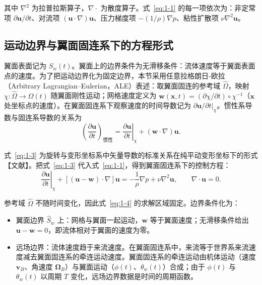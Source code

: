 \documentclass[11pt,a4paper]{ctexart}
\numberwithin{equation}{section}
\begin{document}
其中 $\nabla^2$ 为拉普拉斯算子，$\nabla\cdot$ 为散度算子。式~\eqref{eq:1-1} 的每一项依次为：非定常项 $\partial\bm{u}/\partial t$、对流项 $(\bm{u}\cdot\nabla)\bm{u}$、压力梯度项 $-(1/\rho)\nabla p$、粘性扩散项 $\nu\nabla^2\bm{u}$。

\subsection{运动边界与翼面固连系下的方程形式}

翼面表面记为 $S_w(t)$。翼面上的边界条件为无滑移条件：流体速度等于翼面表面点的速度。为了把运动边界化为固定边界，本节采用任意拉格朗日-欧拉（Arbitrary Lagrangian--Eulerian，ALE）表述：取翼面固连的参考域 $\hat{\Omega}$，映射 $\chi\colon \hat{\Omega} \to \Omega(t)$ 随翼面刚性运动；网格速度定义为 $\bm{w}(\bm{x}, t) = (\partial\chi/\partial t)\circ\chi^{-1}$（$\bm{x}$ 处坐标点的速度）。在翼面固连系下观察速度的时间导数记为 $\partial\bm{u}/\partial t|_\chi$。惯性系导数与固连系导数的关系为
\begin{equation}
  \left(\frac{\partial\bm{u}}{\partial t}\right)_{\text{惯性}}
  = \left.\frac{\partial\bm{u}}{\partial t}\right|_\chi + (\bm{w}\cdot\nabla)\bm{u}. \label{eq:1-3}
\end{equation}

式~\eqref{eq:1-3} 为旋转与变形坐标系中矢量导数的标准关系在纯平动变形坐标下的形式【文献】。把式~\eqref{eq:1-3} 代入式~\eqref{eq:1-1}，得到翼面固连系下的控制方程：
\begin{equation}
  \left.\frac{\partial\bm{u}}{\partial t}\right|_\chi + [(\bm{u} - \bm{w})\cdot\nabla]\bm{u}
  = -\frac{1}{\rho}\nabla p + \nu\nabla^2\bm{u}, \qquad \nabla\cdot\bm{u} = 0. \label{eq:1-4}
\end{equation}

参考域 $\hat{\Omega}$ 不随时间变化，因此式~\eqref{eq:1-4} 的求解区域固定。边界条件化为：

\begin{itemize}
  \item 翼面边界 $\hat{S}_w$ 上：网格与翼面一起运动，$\bm{w}$ 等于翼面速度；无滑移条件给出 $\bm{u} - \bm{w} = 0$，即流体相对于翼面的速度为零。
  \item 远场边界：流体速度趋于来流速度。在翼面固连系中，来流等于世界系来流速度减去翼面固连系的牵连运动速度。翼面固连系的牵连运动由机体运动（速度 $\bm{v}_B$、角速度 $\bm{\Omega}_B$）与翼面运动（$\phi(t)$、$\theta_w(t)$）合成；由于 $\phi(t)$ 与 $\theta_w(t)$ 以周期 $T$ 变化，远场边界数据是时间的周期函数。
\end{itemize}
\end{document}
